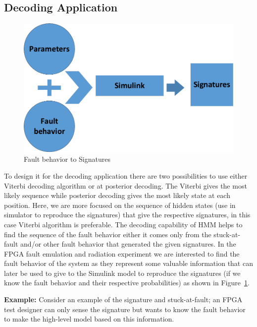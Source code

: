 \subsection{Decoding Application}


\begin{figure}[tb!]

 \centering
  \captionsetup{justification=centering}    
   \includegraphics[scale=0.8]{Figures/fromhiddentosignature.pdf}
   \caption{Fault behavior to Signatures}
\label{fig:HMMsig}
\end{figure}


To design it for the decoding application there are two possibilities to use either Viterbi decoding algorithm or at posterior decoding. The Viterbi gives the most likely sequence while posterior decoding gives the most likely state at each position. Here, we are more focused on the sequence of hidden states (use in simulator to reproduce the signatures) that give the respective signatures, in this case Viterbi algorithm is preferable. The decoding capability of HMM helps to find the sequence of the fault behavior either it comes only from the stuck-at-fault and/or other fault behavior that generated the given signatures. In the FPGA fault emulation and radiation experiment we are interested to find the fault behavior of the system as they represent some valuable information that can later be used to give to the Simulink model to reproduce the signatures (if we know the fault behavior and their respective probabilities) as shown in Figure~\ref{fig:HMMsig}.




 
\textbf{Example:} Consider an example of the signature and stuck-at-fault; an FPGA test designer can only sense the signature but wants to know the fault behavior to make the high-level model based on this information.

